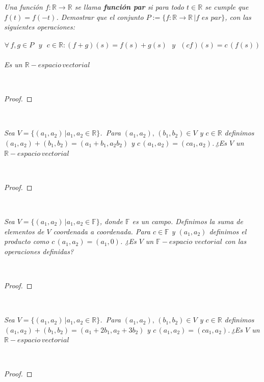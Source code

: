 \documentclass[11pt,letterpaper]{article}
\begin{document}
\begin{tcolorbox}[
	title = \textcolor{black}{\textcolor{white}{Problema 6}},]
\textit{Una funci\'on $f:\mathbb{R}\rightarrow \mathbb{R}$ se llama \textbf{funci\'on par} si para todo $t\in \mathbb{R}$ se cumple que
$f(t)=f(-t)$. Demostrar que el conjunto $P:=\{f:\mathbb{R}\rightarrow\mathbb{R}\,| f\,\,es \,\,par\}$, con las siguientes operaciones:\,\\
\,\\
\begin{equation*}
    \forall\,f,g \in P\,\,\,\,y\,\,\,\,c\in \mathbb{R}:(f+g)(s)=f(s)+g(s)\,\,\,\,y\,\,\,\,(cf)(s)=c\,(f(s))
\end{equation*}\,\\
Es un $\mathbb{R}-espacio\,vectorial$ 
}
\end{tcolorbox}\,\\
\begin{proof}
    
\end{proof}\,\\
\begin{tcolorbox}[
	title = \textcolor{black}{\textcolor{white}{Problema 7}},]
\textit{Sea $V=\{(a_1,a_2)\,|a_1,a_2\in \mathbb{R}\}$. \,Para $(a_1,a_2),\,(b_1,b_2)\in V$ y $c\in \mathbb{R}$
definimos $(a_1,a_2)+(b_1,b_2)=(a_1+b_1,a_2b_2)$ y $c\,(a_1,a_2)=(ca_1,a_2)$.\,¿Es $V$ un $\mathbb{R}-espacio\,vectorial$
}
\end{tcolorbox}\,\\
\begin{proof}
    
\end{proof}\,\\
\begin{tcolorbox}[
	title = \textcolor{black}{\textcolor{white}{Problema 8}},]
\textit{Sea $V=\{(a_1,a_2)\,|a_1,a_2\in \mathbb{F}\}$, donde $\mathbb{F}$ es un campo. Definimos la suma de elementos de $V$ 
coordenada a coordenada. Para $c\in \mathbb{F}$ y $(a_1,a_2)$ definimos el producto como $c\,(a_1,a_2)=(a_1,0)$. ¿Es $V$
un $\mathbb{F}-espacio\,\,vectorial$ con las operaciones definidas?}
\end{tcolorbox}\,\\
\begin{proof}
    
\end{proof}\,\\

\begin{tcolorbox}[
	title = \textcolor{black}{\textcolor{white}{Problema 9}},]
\textit{Sea $V=\{(a_1,a_2)\,|a_1,a_2\in \mathbb{R}\}$. \,Para $(a_1,a_2),\,(b_1,b_2)\in V$ y $c\in \mathbb{R}$
definimos $(a_1,a_2)+(b_1,b_2)=(a_1+2b_1,a_2+3b_2)$ y $c\,(a_1,a_2)=(ca_1,a_2)$.\,¿Es $V$ un $\mathbb{R}-espacio\,vectorial$
}
\end{tcolorbox}\,\\
\begin{proof}
    
\end{proof}\,\\
\end{document}
